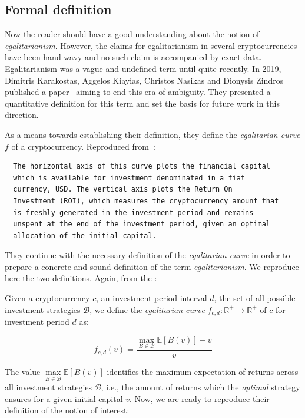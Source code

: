 \subsection{Formal definition}
Now the reader should have a good understanding about the notion of \emph{egalitarianism}. However, the claims for egalitarianism in several cryptocurrencies have been hand wavy and no such claim is accompanied by exact data. Egalitarianism was a vague and undefined term until quite recently. In 2019, Dimitris Karakostas, Aggelos Kiayias, Christos Nasikas and Dionysis Zindros published a paper~\cite{egalitarianism} aiming to end this era of ambiguity. They presented a quantitative definition for this term and set the basis for future work in this direction.

As a means towards establishing their definition, they define the \emph{egalitarian curve} $f$ of a cryptocurrency. Reproduced from~\cite{egalitarianism}:
\begin{verbatim}
  The horizontal axis of this curve plots the financial capital
  which is available for investment denominated in a fiat
  currency, USD. The vertical axis plots the Return On
  Investment (ROI), which measures the cryptocurrency amount that
  is freshly generated in the investment period and remains
  unspent at the end of the investment period, given an optimal
  allocation of the initial capital.
\end{verbatim}

They continue with the necessary definition of the \emph{egalitarian curve} in order to prepare a concrete and sound definition of the term \emph{egalitarianism}. We reproduce here the two definitions. Again, from the \cite{egalitarianism}:

\begin{definition}
    Given a cryptocurrency $c$, an investment period interval $d$, the set of
    all possible investment strategies $\mathcal{B}$, we define the \emph{egalitarian curve}
    $f_{c,d}: \mathbb{R}^+ \longrightarrow \mathbb{R}^+$ of $c$ for
    investment period $d$ as:

    \begin{equation} \nonumber
      f_{c,d}(v) = \frac{\underset{B \in \mathcal{B}}{\max}{\mathbb{E}[B(v)]} - v}{v}
    \end{equation}
\end{definition}

The value $\underset{B \in \mathcal{B}}{\max}{\mathbb{E}[B(v)]}$ identifies the maximum expectation of
returns across all investment strategies $\mathcal{B}$, i.e., the amount of
returns which the \emph{optimal} strategy ensures for a given initial capital $v$. Now, we are ready to reproduce their definition of the notion of interest:

